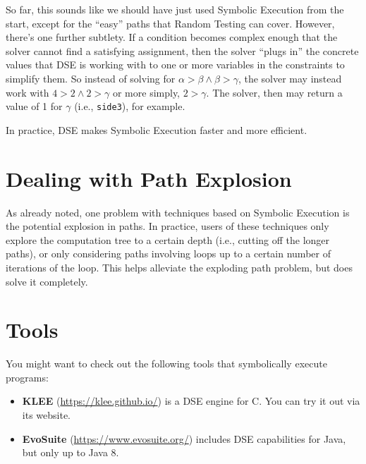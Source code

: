 
So far, this sounds like we should have just used Symbolic Execution from the
start, except for the ``easy'' paths that Random Testing can cover. However,
there’s one further subtlety. If a condition becomes complex enough that the
solver cannot find a satisfying assignment, then the solver ``plugs in'' the
concrete values that DSE is working with to one or more variables in the
constraints to simplify them. So instead of solving for $\alpha > \beta \wedge
\beta > \gamma$, the solver may instead work with $4 > 2 \wedge 2 > \gamma$ or
more simply, $2 > \gamma$. The solver, then may return a value of 1 for $\gamma$
(i.e., {\tt side3}), for example.


In practice, DSE makes Symbolic Execution faster and more efficient. 

\section{Dealing with Path Explosion}

As already noted, one problem with techniques based on Symbolic Execution is the
potential explosion in paths. In practice, users of these techniques only
explore the computation tree to a certain depth (i.e., cutting off the longer
paths), or only considering paths involving loops up to a certain number of
iterations of the loop. This helps alleviate the exploding path problem, but
does solve it completely.

\section{Tools}

You might want to check out the following tools that symbolically execute
programs:

\begin{itemize}

    \item {\bf KLEE} (\url{https://klee.github.io/}) is a DSE engine for C. You
can try it out via its website.

    \item {\bf EvoSuite} (\url{https://www.evosuite.org/}) includes DSE
capabilities for Java, but only up to Java 8.

\end{itemize}

